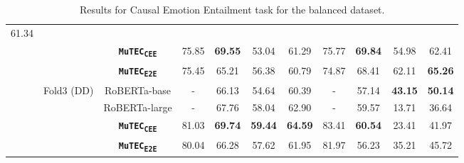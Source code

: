 \documentclass{article}
\newcommand{\subtwo}{\textbf{\texttt{MuTEC\textsubscript{CEE}}}}
\newcommand{\overall}{\textbf{\texttt{MuTEC\textsubscript{E2E}}}}
\begin{document}
\begin{table*}[h]
{\begin{tabular}{|c|c|c|cccc|cccc|}
  61.34
   \\ \cline{3-11} 
 &
   &
  \subtwo &
  \multicolumn{1}{c|}{75.85} &
  \multicolumn{1}{c|}{\textbf{69.55}} &
  \multicolumn{1}{c|}{53.04} &
  61.29 &
  \multicolumn{1}{c|}{75.77} &
  \multicolumn{1}{c|}{\textbf{69.84}} &
  \multicolumn{1}{c|}{54.98} &
  62.41 
  \\ \cline{3-11} 
 &
   &
  \overall &
  \multicolumn{1}{c|}{75.45} &
  \multicolumn{1}{c|}{65.21} &
  \multicolumn{1}{c|}{56.38} &
  60.79 &
  \multicolumn{1}{c|}{74.87} &
  \multicolumn{1}{c|}{68.41} &
  \multicolumn{1}{c|}{62.11} &
  \textbf{65.26}
  \\ \cline{2-11} 
 &
  \multirow{3}{*}{Fold3 (DD)} &
  RoBERTa-base &
  \multicolumn{1}{c|}{-} &
  \multicolumn{1}{c|}{66.13} &
  \multicolumn{1}{c|}{54.64} &
   60.39 &
  \multicolumn{1}{c|}{-} &
  \multicolumn{1}{c|}{57.14} &
  \multicolumn{1}{c|}{\textbf{43.15}} &
   \textbf{50.14}
   \\ \cline{3-11} 
 &
   &
  RoBERTa-large &
  \multicolumn{1}{c|}{-} &
  \multicolumn{1}{c|}{67.76} &
  \multicolumn{1}{c|}{58.04} &
   62.90 &
  \multicolumn{1}{c|}{-} &
  \multicolumn{1}{c|}{59.57} &
  \multicolumn{1}{c|}{13.71} &
  36.64 
   \\ \cline{3-11} 
 &
   &
  \subtwo &
  \multicolumn{1}{c|}{81.03} &
  \multicolumn{1}{c|}{\textbf{69.74}} &
  \multicolumn{1}{c|}{\textbf{59.44}} &
  \textbf{64.59} &
  \multicolumn{1}{c|}{83.41} &
  \multicolumn{1}{c|}{\textbf{60.54}} &
  \multicolumn{1}{c|}{23.41} &
  41.97 
  \\ \cline{3-11} 
 &
   &
  \overall &
  \multicolumn{1}{c|}{80.04} &
  \multicolumn{1}{c|}{66.28} &
  \multicolumn{1}{c|}{57.62} &
  61.95 &
  \multicolumn{1}{c|}{81.97} &
  \multicolumn{1}{c|}{56.23} &
  \multicolumn{1}{c|}{35.21} &
  45.72
  \\ \hline
\end{tabular}
}
\caption{Results for Causal Emotion Entailment task for the balanced dataset.}
\label{tab:sub2_balanced}
\vspace{-5mm}
\end{table*}
 
\end{document}
